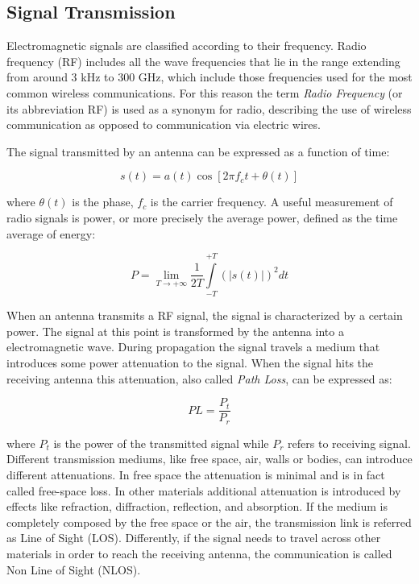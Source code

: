 \subsection{Signal Transmission}
\label{subsec:sig_tx}
Electromagnetic signals are classified according to their frequency. Radio frequency (RF) includes all the wave frequencies that lie in the range extending from around 3 kHz to 300 GHz, which include those frequencies used for the most common wireless communications. For this reason the term \emph{Radio Frequency} (or its abbreviation RF) is used as a synonym for radio, describing the use of wireless communication as opposed to communication via electric wires.

The signal transmitted by an antenna can be expressed as a function of time:


\begin{equation}\label{eq:sig_func}
s(t) = a(t) \cos [2 \pi f_c t + \theta(t)]
\end{equation}

where $\theta(t)$ is the phase, $f_c$ is the carrier frequency. A useful measurement of radio signals is power, or more precisely the average power, defined as the time average of energy:

\begin{equation}\label{eq:sig_power}
P = \lim_{T \to +\infty} \frac{1}{2T} \int\limits_{-T}^{+T} (|s(t)|)^2 dt
\end{equation}

When an antenna transmits a RF signal, the signal is characterized by a certain power. The signal at this point is transformed by the antenna into a electromagnetic wave. During propagation the signal travels a medium that introduces some power attenuation to the signal. When the signal hits the receiving antenna this attenuation, also called \emph{Path Loss}, can be expressed as:

\begin{equation}\label{eq:path_loss}
PL = \frac{P_t}{P_r}
\end{equation}

where $P_t$ is the power of the transmitted signal while $P_r$ refers to receiving signal. Different transmission mediums, like free space, air, walls or bodies, can introduce different attenuations. In free space the attenuation is minimal and is in fact called free-space loss. In other materials additional attenuation is introduced by effects like refraction, diffraction, reflection, and absorption. If the medium is completely composed by the free space or the air, the transmission link is referred as Line of Sight (LOS). Differently, if the signal needs to travel across other materials in order to reach the receiving antenna, the communication is called Non Line of Sight (NLOS).

